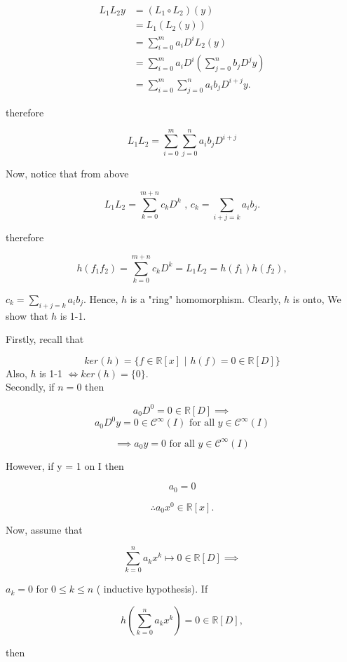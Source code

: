 \hrulefill

\begin{align*}
  L_1 L_2 y &= (L_1 \circ L_2)(y)\\
  &= L_1(L_2(y)) \\
  &= \sum_{i=0}^m a_iD^iL_2(y) \\
  &= \sum_{i=0}^m a_iD^i\left(\sum_{j=0}^n b_jD^jy\right) \\
  &= \sum_{i=0}^m \sum_{j=0}^n a_ib_jD^{i+j}y.
\end{align*}

therefore 

\[ L_1 L_2 = \sum_{i=0}^m \sum_{j=0}^n a_ib_jD^{i+j}\]


Now, notice that from above 

\[ L_1 L_2 = \sum_{k=0}^{m+n}c_kD^k \text{ , } c_k = \sum_{i+j=k} a_ib_j.\]

therefore

\[ h(f_1 f_2) = \sum_{k=0}^{m+n}c_kD^k = L_1L_2 = h(f_1)h(f_2), \]

\( c_k = \sum_{i+j=k} a_ib_j \).  Hence, \( h \) is a "ring"
homomorphism. Clearly, \( h \) is onto, We show that \( h \) is 1-1. 

Firstly, recall that 

\[ ker(h)= \{ f \in \mathbb{R}[x] \text{ | } h(f) = 0 \in \mathbb{R}[D]
\} \]
Also, \( h \) is 1-1 \( \iff ker(h) = \{0\} \). \\[5mm]

Secondly, if \( n=0 \) then 

\[ a_0D^0 = 0 \in \mathbb{R}[D] \implies  \]
\[ a_0D^0y = 0 \in  \mathscr{C}^{\infty} (I) \text{ for all } y \in
\mathscr{C}^{\infty} (I)\]

\[ \implies a_0y = 0 \text{ for all } y \in \mathscr{C}^{\infty} (I) \]

However, if y = 1 on I then 

\[ a_0 = 0  \]

\[\therefore a_0x^0 \in \mathbb{R}[x]. \]


Now, assume that 

\[ \sum_{k=0}^n a_kx^k  \mapsto 0 \in \mathbb{R}[D] \implies\]

\( a_k =0  \) for \(  0 \leq k \leq n \) ( inductive hypothesis). If 

\[ h \left(  \sum_{k=0}^n a_kx^k\right) = 0 \in \mathbb{R}[D] , \]

then

